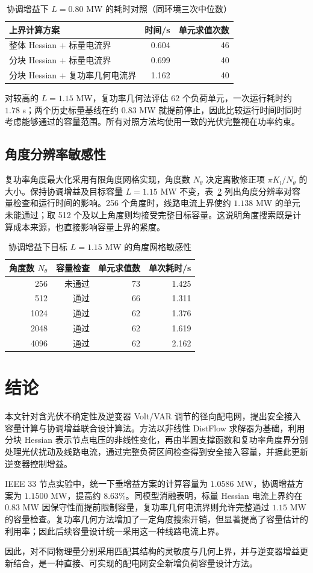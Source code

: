 \begin{table}[htbp]
\centering
\caption{协调增益下 $L=0.80$ MW 的耗时对照（同环境三次中位数）}
\label{tab:runtime}
\begin{tabular}{@{}p{80mm}rr@{}}
\toprule
上界计算方案 & 时间/s & 单元求值次数\\
\midrule
整体 Hessian + 标量电流界 & 0.604 & 46\\
分块 Hessian + 标量电流界 & 0.699 & 40\\
分块 Hessian + 复功率几何电流界 & 1.162 & 40\\
\bottomrule
\end{tabular}
\end{table}

对较高的 $L=1.15$ MW，复功率几何法评估 $62$ 个负荷单元，一次运行耗时约 $1.78$ s；两个历史标量基线在约 $0.83$ MW 就提前停止，因此比较运行时间时同时考虑能够通过的容量范围。所有对照方法均使用一致的光伏完整视在功率约束。

\subsection{角度分辨率敏感性}
复功率角度最大化采用有限角度网格实现，角度数 $N_\theta$ 决定离散修正项 $\pi K_l/N_\theta$ 的大小。保持协调增益及目标容量 $L=1.15$ MW 不变，表~\ref{tab:angular} 列出角度分辨率对容量检查和运行时间的影响。256 个角度时，线路电流上界使约 $1.138$ MW 的单元未能通过；取 512 个及以上角度则均接受完整目标容量。这说明角度搜索既是计算成本来源，也直接影响容量上界的紧度。

\begin{table}[htbp]
\centering
\caption{协调增益下目标 $L=1.15$ MW 的角度网格敏感性}
\label{tab:angular}
\begin{tabular}{@{}rrrr@{}}
\toprule
角度数 $N_\theta$ & 容量检查 & 单元求值数 & 单次耗时/s\\
\midrule
256 & 未通过 & 73 & 1.425\\
512 & 通过 & 66 & 1.311\\
1024 & 通过 & 62 & 1.376\\
2048 & 通过 & 62 & 1.619\\
4096 & 通过 & 62 & 2.162\\
\bottomrule
\end{tabular}
\end{table}

\section{结论}
本文针对含光伏不确定性及逆变器 Volt/VAR 调节的径向配电网，提出安全接入容量计算与协调增益联合设计算法。方法以非线性 DistFlow 求解器为基础，利用分块 Hessian 表示节点电压的非线性变化，再由半圆支撑函数和复功率角度界分别处理光伏扰动及线路电流，通过完整负荷区间检查得到安全接入容量，并据此更新逆变器控制增益。

IEEE 33 节点实验中，统一下垂增益方案的计算容量为 $1.0586$ MW，协调增益方案为 $1.1500$ MW，提高约 $8.63\%$。同模型消融表明，标量 Hessian 电流上界约在 $0.83$ MW 因保守性而提前限制容量，复功率几何电流界则允许完整通过 $1.15$ MW 的容量检查。复功率几何方法增加了一定角度搜索开销，但显著提高了容量估计的利用率；因此后续容量设计统一采用这一种线路电流上界。

因此，对不同物理量分别采用匹配其结构的灵敏度与几何上界，并与逆变器增益更新结合，是一种直接、可实现的配电网安全新增负荷容量设计方法。
